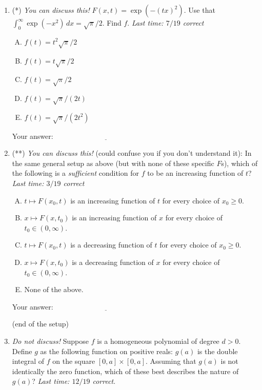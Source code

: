 \documentclass[10pt]{amsart}
\begin{document}
\begin{enumerate}
\item (*) {\em You can discuss this!} $F(x,t) = \exp(-(tx)^2)$. Use that
  $\int_0^\infty \exp(-x^2) \, dx= \sqrt{\pi}/2$. Find $f$. {\em Last
  time: $7/19$ correct}

  \begin{enumerate}[(A)]
  \item $f(t) = t^2\sqrt{\pi}/2$
  \item $f(t) = t\sqrt{\pi}/2$
  \item $f(t) = \sqrt{\pi}/2$
  \item $f(t) = \sqrt{\pi}/(2t)$
  \item $f(t) = \sqrt{\pi}/(2t^2)$
  \end{enumerate}

  \vspace{0.1in}
  Your answer: $\underline{\qquad\qquad\qquad\qquad\qquad\qquad\qquad}$
  \vspace{0.15in}

\item (**) {\em You can discuss this!} (could confuse you if you don't
  understand it): In the same general setup as above (but with none of
  these specific $F$s), which of the following is a {\em sufficient}
  condition for $f$ to be an increasing function of $t$? {\em Last
  time: $3/19$ correct}

  \begin{enumerate}[(A)]
  \item $t \mapsto F(x_0,t)$ is an increasing function of $t$ for
    every choice of $x_0 \ge 0$.
  \item $x \mapsto F(x,t_0)$ is an increasing function of $x$ for
    every choice of $t_0 \in (0,\infty)$.
  \item $t \mapsto F(x_0,t)$ is a decreasing function of $t$ for
    every choice of $x_0 \ge 0$.
  \item $x \mapsto F(x,t_0)$ is a decreasing function of $x$ for
  every choice of $t_0 \in (0,\infty)$.
  \item None of the above.
  \end{enumerate}

  \vspace{0.1in}
  Your answer: $\underline{\qquad\qquad\qquad\qquad\qquad\qquad\qquad}$
  \vspace{0.3in}

  (end of the setup)

  \vspace{0.3in}

\item {\em Do not discuss!} Suppose $f$ is a homogeneous polynomial of
  degree $d > 0$. Define $g$ as the following function on positive
  reals: $g(a)$ is the double integral of $f$ on the square $[0,a]
  \times [0,a]$. Assuming that $g(a)$ is not identically the zero
  function, which of these best describes the nature of $g(a)$? {\em
  Last time: $12/19$ correct}.


\end{enumerate}
\end{document}
